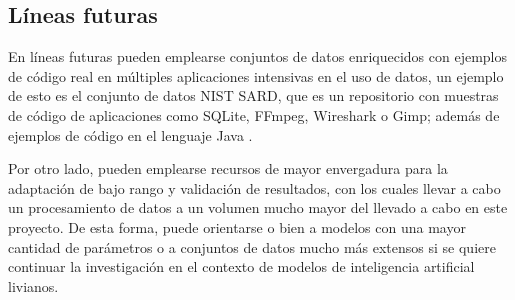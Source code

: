 \documentclass[12pt, a4paper, twoside]{article}
\begin{document}
\subsection{Líneas futuras}
En líneas futuras pueden emplearse conjuntos de datos enriquecidos con ejemplos de código real en múltiples aplicaciones intensivas en el uso de datos, un ejemplo de esto es el conjunto de datos NIST SARD, que es un repositorio con muestras de código de aplicaciones como SQLite, FFmpeg, Wireshark o Gimp; además de ejemplos de código en el lenguaje Java \cite{nist-sard}.

Por otro lado, pueden emplearse recursos de mayor envergadura para la adaptación de bajo rango y validación de resultados, con los cuales llevar a cabo un procesamiento de datos a un volumen mucho mayor del llevado a cabo en este proyecto. De esta forma, puede orientarse o bien a modelos con una mayor cantidad de parámetros o a conjuntos de datos mucho más extensos si se quiere continuar la investigación en el contexto de modelos de inteligencia artificial livianos.


\printbibliography
\end{document}
